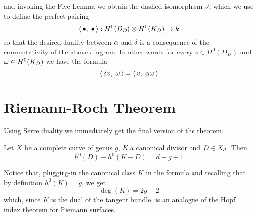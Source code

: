 	and invoking the Five Lemma we obtain the dashed isomorphism $\vartheta$, which we use to define the perfect pairing
	$$ \langle\,\bullet,\;\bullet\,\rangle : H^0(D_D)\otimes H^0(K_D) \to k $$
	so that the desired duality between $\alpha$ and $\delta$ is a consequence of the commutativity of the above diagram. In other words for every $ v\in H^0(D_D)$ and $\omega\in H^0(K_D)$ we have the formula
	\begin{equation}\label{eq:deltalpha}
		\langle\, \delta v,\; \omega \,\rangle = \langle\, v,\; \alpha \omega \,\rangle
	\end{equation}

	
	
	
	
	
	
	
	
	
	

\section{Riemann-Roch Theorem}
	Using Serre duality we immediately get the final version of the theorem.
	\begin{namedtheo}[\RR Theorem]
		Let $X$ be a complete curve of genus $g$, $K$ a canonical divisor and $D\in X_d$. Then
		\begin{equation}\label{thm:RR}
			h^0(D) - h^0(K-D) = d-g+1
		\end{equation}
	\end{namedtheo}
	Notice that, plugging-in the canonical class $K$ in the \RR formula and recalling that by definition $h^0(K) = g$, we get
	$$ \deg(K) = 2g-2 $$
	which, since $K$ is the dual of the tangent bundle, is an analogue of the Hopf index theorem for Riemann surfaces.

